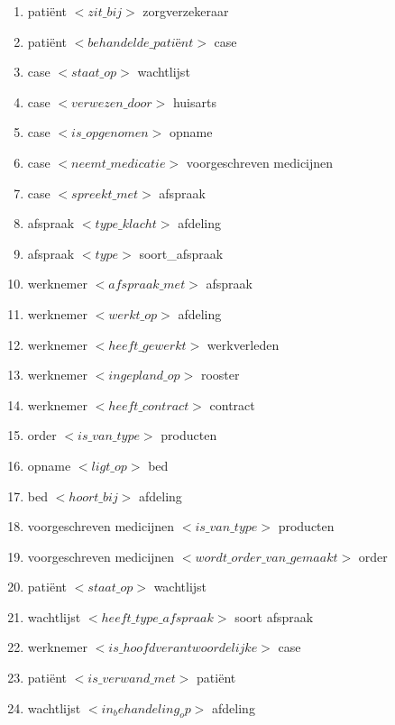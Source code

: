 %
%
	\begin{enumerate}
    \item pati\"ent ${<zit\_bij>}$ zorgverzekeraar
    \item pati\"ent ${<behandelde\_pati}$\"e${nt>}$ case
    \item case ${<staat\_op>}$ wachtlijst
    \item case ${<verwezen\_door>}$ huisarts
    \item case ${<is\_opgenomen>}$ opname
    \item case ${<neemt\_medicatie>}$ voorgeschreven medicijnen
    \item case ${<spreekt\_met>}$ afspraak
    \item afspraak ${<type\_klacht>}$ afdeling
    \item afspraak ${<type>}$ soort\_afspraak
    \item werknemer ${<afspraak\_met>}$ afspraak
    \item werknemer ${<werkt\_op>}$ afdeling
    \item werknemer ${<heeft\_gewerkt>}$ werkverleden
    \item werknemer ${<ingepland\_op>}$ rooster
    \item werknemer ${<heeft\_contract>}$ contract
    \item order ${<is\_van\_type>}$ producten
    \item opname ${<ligt\_op>}$ bed
    \item bed ${<hoort\_bij>}$ afdeling
    \item voorgeschreven medicijnen ${<is\_van\_type>}$ producten
    \item voorgeschreven medicijnen ${<wordt\_order\_van\_gemaakt>}$ order
    \item pati\"ent ${<staat\_op>}$ wachtlijst
    \item wachtlijst ${<heeft\_type\_afspraak>}$ soort afspraak
    \item werknemer ${<is\_hoofdverantwoordelijke>}$ case
    \item pati\"ent ${<is\_verwand\_met>}$ pati\"ent
    \item wachtlijst ${<in_behandeling_op>}$ afdeling

	\end{enumerate} 